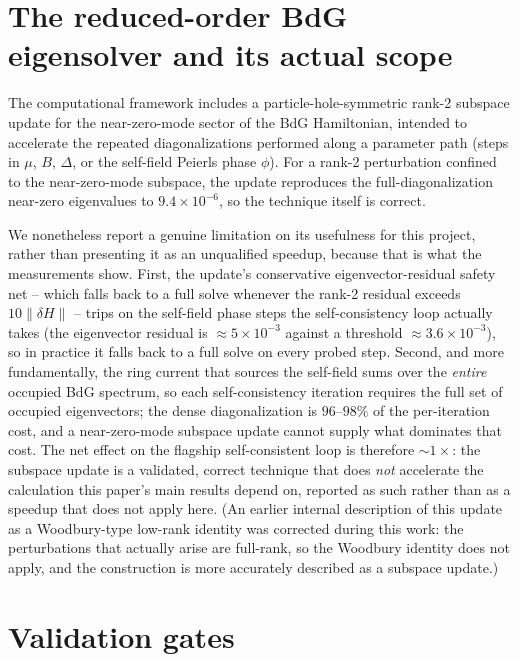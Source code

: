 \documentclass[aps,physrev,reprint,superscriptaddress,amsmath,amssymb,floatfix]{revtex4-2}
\begin{document}
\appendix

\section{The reduced-order BdG eigensolver and its actual scope}
\label{app:eigensolver}

The computational framework includes a particle-hole-symmetric rank-2
subspace update for the near-zero-mode sector of the BdG Hamiltonian,
intended to accelerate the repeated diagonalizations performed along a
parameter path (steps in $\mu$, $B$, $\Delta$, or the self-field Peierls
phase $\phi$). For a rank-2 perturbation confined to the near-zero-mode
subspace, the update reproduces the full-diagonalization near-zero
eigenvalues to $9.4\times10^{-6}$, so the technique itself is correct.

We nonetheless report a genuine limitation on its usefulness for this
project, rather than presenting it as an unqualified speedup, because that
is what the measurements show. First, the update's conservative
eigenvector-residual safety net -- which falls back to a full solve
whenever the rank-2 residual exceeds $10\lVert\delta H\rVert$ -- trips on
the self-field phase steps the self-consistency loop actually takes (the
eigenvector residual is $\approx5\times10^{-3}$ against a threshold
$\approx3.6\times10^{-3}$), so in practice it falls back to a full solve on
every probed step. Second, and more fundamentally, the ring current that
sources the self-field sums over the \emph{entire} occupied BdG spectrum,
so each self-consistency iteration requires the full set of occupied
eigenvectors; the dense diagonalization is $96$--$98\%$ of the
per-iteration cost, and a near-zero-mode subspace update cannot supply what
dominates that cost. The net effect on the flagship self-consistent loop is
therefore $\sim\!1\times$: the subspace update is a validated, correct
technique that does \emph{not} accelerate the calculation this paper's main
results depend on, reported as such rather than as a speedup that does not
apply here. (An earlier internal description of this update as
a Woodbury-type low-rank identity was corrected during this work: the
perturbations that actually arise are full-rank, so the Woodbury identity
does not apply, and the construction is more accurately described as a
subspace update.)

\section{Validation gates}
\label{app:gates}
\end{document}
